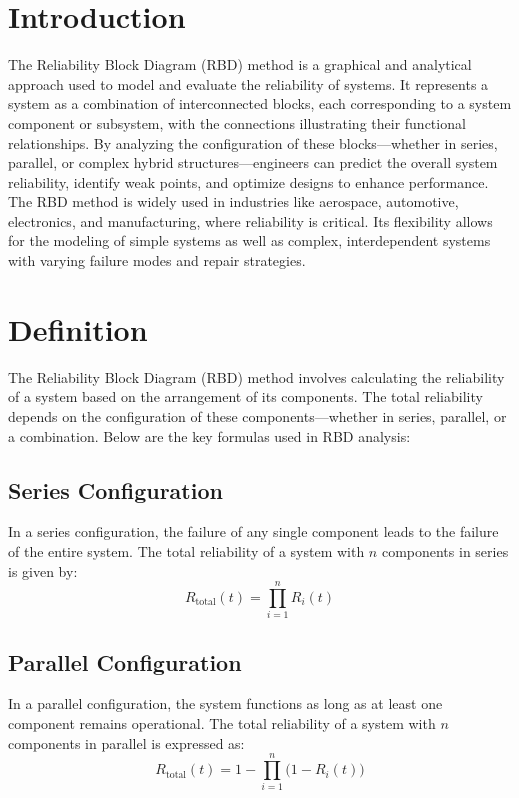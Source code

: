 \documentclass[12pt	]{article}
\begin{document}
\section{Introduction}
The Reliability Block Diagram (RBD) method is a graphical and analytical approach used to model and evaluate the reliability of systems. It represents a system as a combination of interconnected blocks, each corresponding to a system component or subsystem, with the connections illustrating their functional relationships. By analyzing the configuration of these blocks—whether in series, parallel, or complex hybrid structures—engineers can predict the overall system reliability, identify weak points, and optimize designs to enhance performance. The RBD method is widely used in industries like aerospace, automotive, electronics, and manufacturing, where reliability is critical. Its flexibility allows for the modeling of simple systems as well as complex, interdependent systems with varying failure modes and repair strategies.



\section{Definition}
The Reliability Block Diagram (RBD) method involves calculating the reliability of a system based on the arrangement of its components. The total reliability depends on the configuration of these components—whether in series, parallel, or a combination. Below are the key formulas used in RBD analysis:

\subsection{Series Configuration}
In a series configuration, the failure of any single component leads to the failure of the entire system. The total reliability of a system with \(n\) components in series is given by:
\[
R_{\text{total}}(t) = \prod_{i=1}^{n} R_i(t)
\]



\subsection{Parallel Configuration}
In a parallel configuration, the system functions as long as at least one component remains operational. The total reliability of a system with \(n\) components in parallel is expressed as:
\[
R_{\text{total}}(t) = 1 - \prod_{i=1}^{n} \big(1 - R_i(t)\big)
\]
\end{document}

